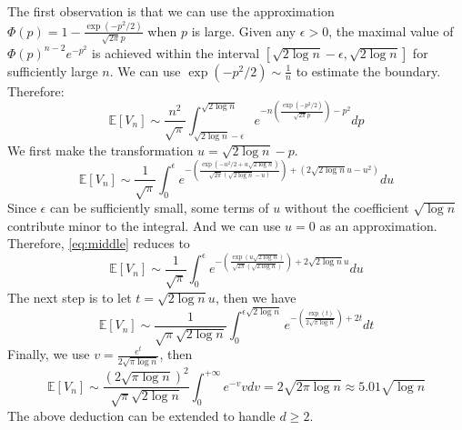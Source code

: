 \documentclass{article}
\def\E{\mathbb{E}}
\begin{document}
The first observation is that we can use the approximation
$\Phi(p) = 1-\frac{\exp(-p^2/2)}{\sqrt{2\pi} p}$
when $p$ is large.
Given any $\epsilon>0$, the maximal value of $\Phi(p)^{n-2}e^{-p^2}$
is achieved within the interval $[\sqrt{2\log n} - \epsilon, \sqrt{2\log n}]$
for sufficiently large $n$. We can use $\exp(-p^2/2) \sim \frac{1}{n}$
to estimate the boundary.
Therefore:
\begin{equation*}
    \E[V_n] \sim \frac{n^2}{\sqrt{\pi}}
    \int_{\sqrt{2\log n} - \epsilon}^{\sqrt{2\log n}}
    e^{-n\left(\frac{\exp(-p^2/2)}{\sqrt{2\pi}p}\right)-p^2}dp
\end{equation*}
We first make the transformation $u=\sqrt{2\log n} - p$.
\begin{equation}\label{eq:middle}
    \E[V_n] \sim \frac{1}{\sqrt{\pi}}
    \int_{0}^{\epsilon}
    e^{-\left(\frac{\exp(-u^2/2+u\sqrt{2\log n})}{\sqrt{2\pi}(\sqrt{2\log n}-u)}\right)+(2\sqrt{2\log n}u-u^2)}du
\end{equation}
Since $\epsilon $ can be sufficiently small, some terms of $u$
without the coefficient $\sqrt{\log n}$ contribute minor to the integral.
And we can use $u=0$ as an approximation. Therefore,
\eqref{eq:middle} reduces to
\begin{equation*}
    \E[V_n] \sim \frac{1}{\sqrt{\pi}}
    \int_{0}^{\epsilon}
    e^{-\left(\frac{\exp(u\sqrt{2\log n})}{\sqrt{2\pi}(\sqrt{2\log n})}\right)+2\sqrt{2\log n}u}du
\end{equation*}
The next step is to let $t=\sqrt{2\log n} u$, then we have
\begin{equation*}
    \E[V_n] \sim \frac{1}{\sqrt{\pi} \sqrt{2\log n}}
    \int_{0}^{\epsilon \sqrt{2\log n}}
    e^{-\left(\frac{\exp(t)}{2\sqrt{\pi\log n}}\right)+2t}dt
\end{equation*}
Finally, we use $v=\frac{e^t}{2\sqrt{\pi \log n}}$,
then
\begin{equation*}
    \E[V_n] \sim \frac{(2\sqrt{\pi \log n})^2}{\sqrt{\pi} \sqrt{2\log n}}
    \int_{0}^{+\infty}
    e^{-v}vdv = 2\sqrt{2\pi \log n} \approx 5.01 \sqrt{\log n}
\end{equation*}
The above deduction can be extended to handle $d\geq 2$.
\end{document}
